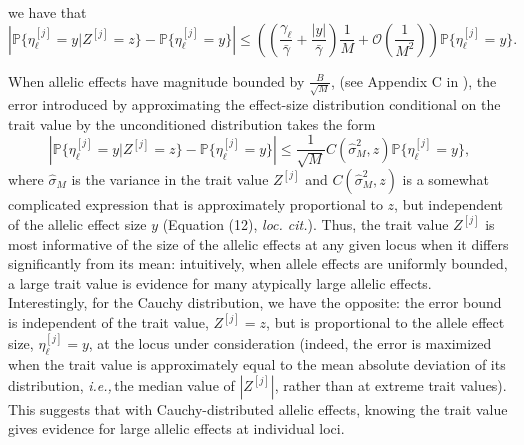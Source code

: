 \documentclass{article}
\renewcommand{\P}{\mathbb{P}}
\newcommand{\ie}{\textit{i.e.,}\,}
\newcommand{\1}{\mathbbm{1}}
\newcommand{\Oh}{{\mathcal O}}
\newcommand{\comment}[1]{{\color{blue} \it #1}}
\DeclareMathOperator*{\sgn}{sgn}
\theoremstyle{remark}
\theoremstyle{definition}
\begin{document}
we have that
\[
    \left|
    \P\{\eta^{[j]}_{\ell} = y \vert Z^{[j]} = z\} - \P\{\eta^{[j]}_{\ell} = y\}
    \right|
    \le \left(\left(\frac{\gamma_{\ell}}{\bar{\gamma}} + \frac{|y|}{\bar{\gamma}}\right) \frac{1}{M} + \Oh\left(\frac{1}{M^2}\right)\right)  \P\{\eta^{[j]}_{\ell} = y\}.
\]

When allelic effects have magnitude bounded by  $\frac{B}{\sqrt{M}}$, (see Appendix C in \citet{barton2017infinitesimal}), the error introduced by approximating the effect-size distribution conditional on the trait value by the unconditioned distribution takes the form
\[
	\left|\P\{\eta^{[j]}_{\ell} = y \vert Z^{[j]} = z\} - \P\{\eta^{[j]}_{\ell} = y\} \right| \leq \frac{1}{\sqrt{M}} C(\hat{\sigma}_{M}^{2},z) \P\{\eta^{[j]}_{\ell} = y\},
\]
where $\hat{\sigma}_{M}$ is the variance in the trait value $Z^{[j]}$ and $C(\hat{\sigma}_{M}^{2},z)$ is a somewhat complicated expression that is approximately proportional to $z$, but independent of the allelic effect size $y$ (Equation (12), \textit{loc. cit.}).  Thus, the trait value $Z^{[j]}$ is most informative of the size of the allelic effects at any given locus when it differs significantly from its mean: intuitively, when allele effects are uniformly bounded, a large trait value is evidence for many atypically large allelic effects.  Interestingly, for the Cauchy distribution, we have the opposite: the error bound is independent of the trait value, $Z^{[j]} = z$, but is proportional to the allele effect size, $\eta^{[j]}_{\ell} = y$, at the locus under consideration (indeed, the error is maximized when the trait value is approximately equal to the mean absolute deviation of its distribution, \ie the median value of $|Z^{[j]}|$, rather than at extreme trait values).  This suggests that with Cauchy-distributed allelic effects, knowing the trait value gives evidence for large allelic effects at individual loci. 
\end{document}
